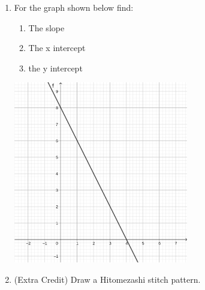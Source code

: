 \documentclass{article}
\begin{document}
\begin{enumerate}
	\item For the graph shown below find:
	\begin{enumerate}
		\item The slope
		\item The x intercept
		\item the y intercept
	\end{enumerate}
	\includegraphics[width=3in]{sptest1_img2.png}
	\item (Extra Credit) Draw a Hitomezashi stitch pattern.
\end{enumerate}
\end{document}
